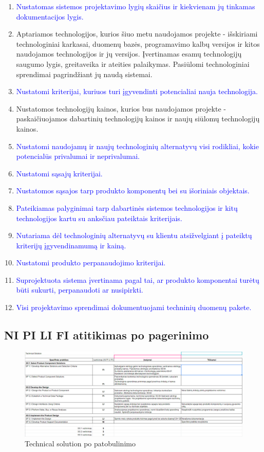 \documentclass{VUMIFPSkursinis}
\begin{document}
	\begin{enumerate}
	\item{\textcolor{blue}{Nustatomas sistemos projektavimo lygių skaičius ir kiekvienam jų tinkamas dokumentacijos lygis.}}
		\item{
			Aptariamos technologijos, kurios šiuo metu naudojamos projekte - išskiriami technologiniai karkasai, duomenų bazės, programavimo kalbų versijos ir kitos naudojamos technologijos ir jų versijos.
			Įvertinamas esamų technologijų saugumo lygis, greitaveika ir ateities palaikymas.
			Pasiūlomi technologiniai sprendimai pagrindžiant jų naudą sistemai.
		}
		\item{\textcolor{blue}{Nustatomi kriterijai, kuriuos turi įgyvendinti potencialiai nauja technologija.}}
		\item{Nustatomos technologijų kainos, kurios bus naudojamos projekte - paskaičiuojamos dabartinių technologijų kainos ir naujų siūlomų technologijų kainos.}
		\item{\textcolor{blue}{Nustatomi naudojamų ir naujų technologinių alternatyvų visi rodikliai, kokie potencialūs privalumai ir neprivalumai.}}
		\item{\textcolor{blue}{Nustatomi sąsajų kriterijai.}}
		\item{\textcolor{blue}{Nustatomos sąsajos tarp produkto komponentų bei su išoriniais objektais.}}
		\item{\textcolor{blue}{Pateikiamas palyginimai tarp dabartinės sistemos technologijos ir kitų technologijos kartu su anksčiau pateiktais kriterijais.}}
		\item{\textcolor{blue}{Nutariama dėl technologinių alternatyvų su klientu atsižvelgiant į pateiktų kriterijų įgyvendinamumą ir kainą.}}
		\item{\textcolor{blue}{Nustatomi produkto perpanaudojimo kriterijai.}}
		\item{\textcolor{blue}{Suprojektuota sistema įvertinama pagal tai, ar produkto komponentai turėtų būti sukurti, perpanaudoti ar nusipirkti.}}
		\item{\textcolor{blue}{Visi projektavimo sprendimai dokumentuojami techninių duomenų pakete.}}
	\end{enumerate}
		\subsection{NI PI LI FI atitikimas po pagerinimo}
				\begin{figure}[!htbp]
					\includegraphics[scale=0.4]{img/tech}
					\caption{Technical solution po patobulinimo} %
					\label{img:ProfilisPo}
				\end{figure}		
		
\end{document}
